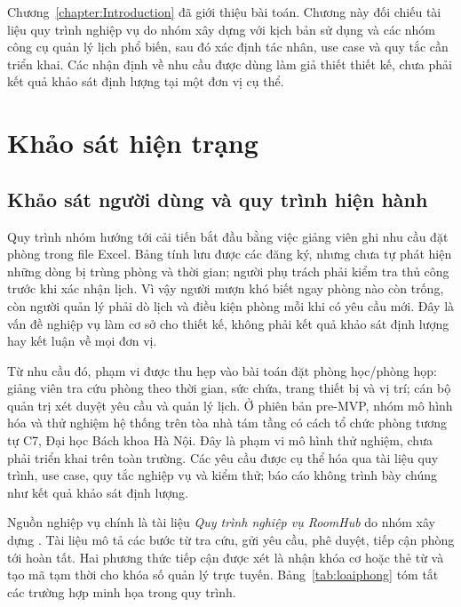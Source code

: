 \documentclass[../DoAn.tex]{subfiles}
\begin{document}
Chương~\ref{chapter:Introduction} đã giới thiệu bài toán. Chương này đối chiếu tài liệu quy trình nghiệp vụ do nhóm xây dựng với kịch bản sử dụng và các nhóm công cụ quản lý lịch phổ biến, sau đó xác định tác nhân, use case và quy tắc cần triển khai. Các nhận định về nhu cầu được dùng làm giả thiết thiết kế, chưa phải kết quả khảo sát định lượng tại một đơn vị cụ thể.

\section{Khảo sát hiện trạng}
\label{section:2.1}

\subsection{Khảo sát người dùng và quy trình hiện hành}
Quy trình nhóm hướng tới cải tiến bắt đầu bằng việc giảng viên ghi nhu cầu đặt phòng trong file Excel. Bảng tính lưu được các đăng ký, nhưng chưa tự phát hiện những dòng bị trùng phòng và thời gian; người phụ trách phải kiểm tra thủ công trước khi xác nhận lịch. Vì vậy người mượn khó biết ngay phòng nào còn trống, còn người quản lý phải dò lịch và điều kiện phòng mỗi khi có yêu cầu mới. Đây là vấn đề nghiệp vụ làm cơ sở cho thiết kế, không phải kết quả khảo sát định lượng hay kết luận về mọi đơn vị.

Từ nhu cầu đó, phạm vi được thu hẹp vào bài toán đặt phòng học/phòng họp: giảng viên tra cứu phòng theo thời gian, sức chứa, trang thiết bị và vị trí; cán bộ quản trị xét duyệt yêu cầu và quản lý lịch. Ở phiên bản pre-MVP, nhóm mô hình hóa và thử nghiệm hệ thống trên tòa nhà tám tầng có cách tổ chức phòng tương tự C7, Đại học Bách khoa Hà Nội. Đây là phạm vi mô hình thử nghiệm, chưa phải triển khai trên toàn trường. Các yêu cầu được cụ thể hóa qua tài liệu quy trình, use case, quy tắc nghiệp vụ và kiểm thử; báo cáo không trình bày chúng như kết quả khảo sát định lượng.

Nguồn nghiệp vụ chính là tài liệu \emph{Quy trình nghiệp vụ RoomHub} do nhóm xây dựng \cite{quytrinh2026}. Tài liệu mô tả các bước từ tra cứu, gửi yêu cầu, phê duyệt, tiếp cận phòng tới hoàn tất. Hai phương thức tiếp cận được xét là nhận khóa cơ hoặc thẻ từ và tạo mã tạm thời cho khóa số quản lý trực tuyến. Bảng~\ref{tab:loaiphong} tóm tắt các trường hợp minh họa trong quy trình.
\end{document}
